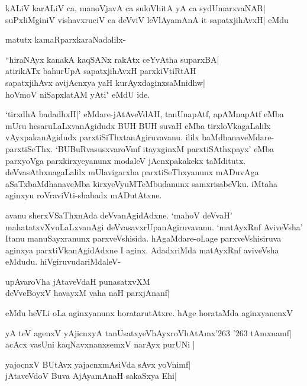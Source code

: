 \begin{shloka}
kALiV karALiV ca, manoVjavA ca suloVhitA yA ca sydUmarxvaNAR|\\\label{116}
suPxliMginiV vishavxruciV ca deVviV leVlAyamAnA it sapatxjihAvxH| eMdu\\
\end{shloka}

matutx kamaRparxkaraNadalilx-

\begin{shloka}
``hiraNAyx kanakA kaqSANx rakAtx ceYvAtha suparxBA|\\\label{116}
atirikATx bahurUpA sapatxjihAvxH parxkiVtiRtAH\\
sapatxjihAvx avijAcnxya yaH kurAyxdaginxsaMnidhw|\\
hoVmoV niSapxlatAM yAti" eMdU ide.
\end{shloka}

`tirxdhA badadhxH|' eMdare-jAtAveVdAH, tanUnapAtf, apAMnapAtf eMba mUru 
hesaruLaLxvanAgidudx BUH BUH suvaH eMba tirxloVkagaLalilx vAyxpakanAgidudx parxtiSiThxtanAgiruvavanu. ililx baMdhanaveMdare-parxtiSeThx. `BUBuRvasusxvaroVmf\label{116} itayxginxM parxtiSAthxpayx' eMba parxyoVga parxkirxyeyanunx modaleV jAcnxpakakekx taMditutx. deVvasAthxnagaLalilx mUlavigarxha parxtiSeThxyanunx mADuvAga aSaTxbaMdhanaveMba kirxyeVyuMTeMbudanunx samxrisabeVku. iMtaha aginxyu roVraviVti-shabadx mADutAtxne.

avanu sherxVSaThxnAda deVvanAgidAdxne. `mahoV deVvaH' 
mahatatxvXvuLaLxvanAgi deVvasavxrUpanAgiruvavanu. `matAyxRnf AviveVsha' Itanu manuSayxranunx parxveVshisida. hAgaMdare-oLage parxveVshisiruva aginxya parxtiVkanAgidAdxne  I aginx. AdadxriMda matAyxRnf aviveVsha eMdudu. hiVgiruvudariMdaleV-

\begin{shloka}
upAvaroVha jAtaveVdaH punasatxvXM\\\label{116}
deVveBoyxV havayxM vaha naH parxjAnanf|
\end{shloka}

eMdu heVLi oLa aginxyanunx horatarutAtxre. hAge horataMda aginxyanenxV 

\begin{shloka}
yA teV agenxV yAjicnxyA tanUsatxyeVhAyxroVhAtAmx\char'263 \char'263 tAmxnamf|\\\label{116}
acAcx vasUni kaqNavxnanxsemxV narAyx purUNi |
\end{shloka}

\begin{shloka}
yajocnxV BUtAvx yajacnxmAsiVda sAvx yoVnimf|\\
jAtaveVdoV Buva AjAyamAnaH sakaSxya Ehi|
\end{shloka}

